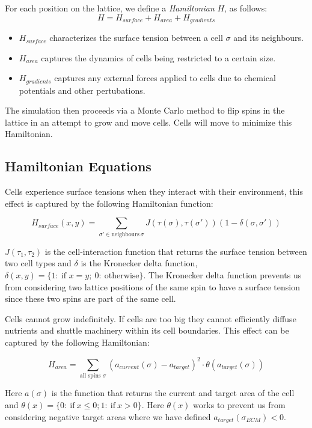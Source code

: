 \documentclass[12pt]{article}
\begin{document}
For each position on the lattice, we define a \emph{Hamiltonian} $H$, as follows:
\[
	H = H_{surface} + H_{area} + H_{gradients}
\]
\begin{itemize}
	\item $H_{surface}$ characterizes the surface tension between a cell $\sigma$ and its neighbours.
	\item $H_{area}$ captures the dynamics of cells being restricted to a certain size.
	\item $H_{gradients}$ captures any external forces applied to cells due to chemical potentials and other pertubations.
\end{itemize}

The simulation then proceeds via a Monte Carlo method to flip spins in the lattice in an attempt to grow and move cells. Cells will move to minimize this Hamiltonian.

\subsection{Hamiltonian Equations}
Cells experience surface tensions when they interact with their environment, this effect is captured by the following Hamiltonian function:

\begin{equation}
	H_{surface} (x,y) = \sum_{\sigma' \in \text{neighbours}~\sigma} J(\tau(\sigma), \tau(\sigma'))(1-\delta(\sigma, \sigma'))
\end{equation}

$J(\tau_1, \tau_2)$ is the cell-interaction function that returns the surface tension between two cell types and $\delta$ is the Kronecker delta function, $\delta(x,y)=\{1:~\text{if }x=y;~0:~\text{otherwise}\}$. The Kronecker delta function prevents us from considering two lattice positions of the same spin to have a surface tension since these two spins are part of the same cell.

Cells cannot grow indefinitely. If cells are too big they cannot efficiently diffuse nutrients and shuttle machinery within its cell boundaries. This effect can be captured by the following Hamiltonian:

\begin{equation}
	H_{area} = \sum_{\text{all spins }\sigma} (a_{current}(\sigma)-a_{target})^2 \cdot \theta(a_{target}(\sigma))
\end{equation}

Here $a(\sigma)$ is the function that returns the current and target area of the cell and $\theta(x)=\{0:~\text{if}~x\leq 0; 1:~\text{if}~x>0\}$. Here $\theta(x)$ works to prevent us from considering negative target areas where we have defined $a_{target}(\sigma_{ECM}) < 0$.
\end{document}
